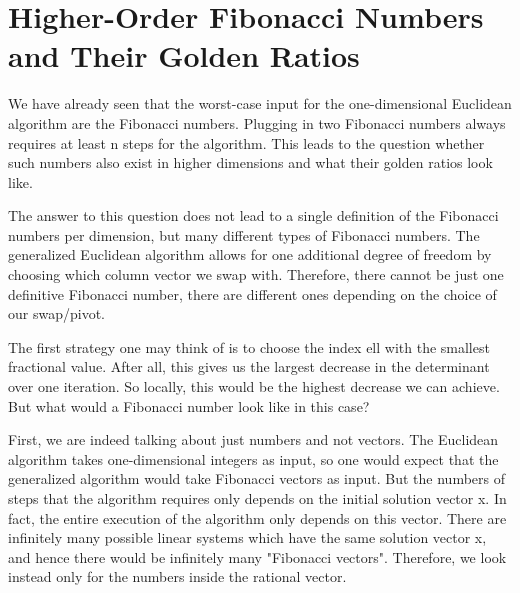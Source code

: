 \section{Higher-Order Fibonacci Numbers and Their Golden Ratios}

We have already seen that the worst-case input for the one-dimensional
Euclidean algorithm are the Fibonacci numbers.
Plugging in two Fibonacci numbers always requires at least n steps for the
algorithm.
This leads to the question whether such numbers also exist in higher dimensions
and what their golden ratios look like.


The answer to this question does not lead to a single definition of the
Fibonacci numbers per dimension, but many different types of Fibonacci numbers.
The generalized Euclidean algorithm allows for one additional degree of freedom
by choosing which column vector we swap with.
Therefore, there cannot be just one definitive Fibonacci number, there are
different ones depending on the choice of our swap/pivot.

The first strategy one may think of is to choose the index ell with the
smallest fractional value.
After all, this gives us the largest decrease in the determinant over one
iteration.
So locally, this would be the highest decrease we can achieve. But what would a
Fibonacci number look like in this case?

First, we are indeed talking about just numbers and not vectors.
The Euclidean algorithm takes one-dimensional integers as input, so one would
expect that the generalized algorithm would take Fibonacci vectors as input.
But the numbers of steps that the algorithm requires only depends on the
initial solution vector x.
In fact, the entire execution of the algorithm only depends on this vector.
There are infinitely many possible linear systems which have the same solution
vector x, and hence there would be infinitely many "Fibonacci vectors".
Therefore, we look instead only for the numbers inside the rational vector.


